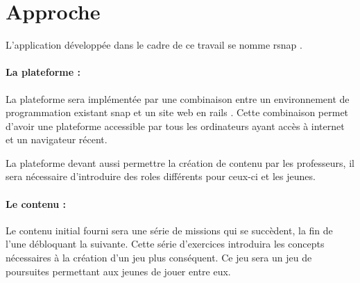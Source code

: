 \section{Approche}
\label{intro-approche}
L'application développée dans le cadre de ce travail se nomme \gls{rsnap} \cite{rsnap}.

\paragraph{La plateforme :} La plateforme sera implémentée par une combinaison entre un environnement de programmation existant \gls{snap} \cite{snap} et un site web en \gls{rails} \cite{rails}. Cette combinaison permet d'avoir une plateforme accessible par tous les ordinateurs ayant accès à internet et un navigateur récent.

La plateforme devant aussi permettre la création de contenu par les professeurs, il sera nécessaire d'introduire des \glspl{role} différents pour ceux-ci et les jeunes.

\paragraph{Le contenu :} Le contenu initial fourni sera une série de \glspl{mission} qui se succèdent, la fin de l'une débloquant la suivante. Cette série d'exercices introduira les concepts nécessaires à la création d'un jeu plus conséquent. Ce jeu sera un jeu de poursuites permettant aux jeunes de jouer entre eux.
